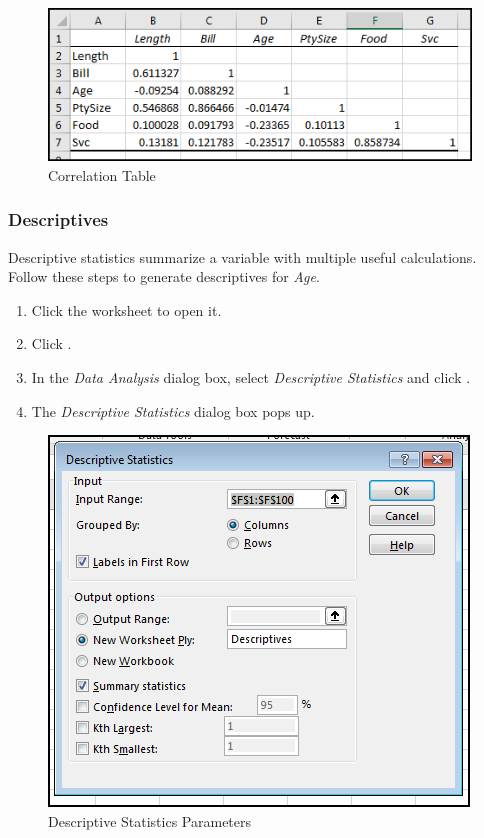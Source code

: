 \begin{figure}[H]
	\centering
	\includegraphics[width=\maxwidth{.95\linewidth}]{gfx/ch09_fig56}
	\caption{Correlation Table}
	\label{09:fig56}
\end{figure}

\subsubsection{Descriptives}

Descriptive statistics summarize a variable with multiple useful calculations. Follow these steps to generate descriptives for \textit{Age}.

\begin{enumerate}[resume]
	\item Click the  worksheet to open it.
	\item Click .
	\item In the \textit{Data Analysis} dialog box, select \textit{Descriptive Statistics} and click .
	\item The \textit{Descriptive Statistics} dialog box pops up.
\end{enumerate}

\begin{figure}[H]
	\centering
	\includegraphics[width=\maxwidth{.75\linewidth}]{gfx/ch09_fig60}
	\caption{Descriptive Statistics Parameters}
	\label{09:fig60}
\end{figure}

